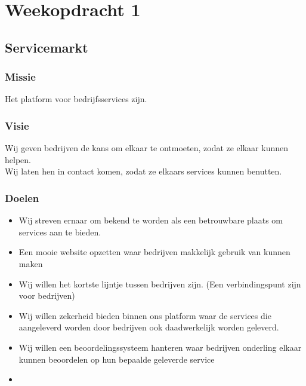 \chapter{Weekopdracht 1}

\iffalse
Wij verbinden bedrijven
Wij laten bedrijven samenwerken
Community van bedrijven
Wij introduceren bedrijven aan elkaar
Matchmaker voor bedrijfrelaties
Om bedrijven makkelijk met elkaar in contact te brengen voor het delen van services.
door middel van delen van services
\fi

\section{Servicemarkt}

\subsection{Missie}
Het platform voor bedrijfsservices zijn.

\subsection{Visie}
Wij geven bedrijven de kans om elkaar te ontmoeten, zodat ze elkaar kunnen helpen. \\
Wij laten hen in contact komen, zodat ze elkaars services kunnen benutten.

\subsection{Doelen}

\begin{itemize}
\item
  Wij streven ernaar om bekend te worden als een betrouwbare plaats om services aan te bieden.
\item
  Een mooie website opzetten waar bedrijven makkelijk gebruik van kunnen maken
\item
  Wij willen het kortste lijntje tussen bedrijven zijn. (Een verbindingspunt zijn voor bedrijven)
\item
  Wij willen zekerheid bieden binnen ons platform waar de services die aangeleverd worden door bedrijven ook daadwerkelijk worden geleverd.
 \item
  Wij willen een beoordelingssysteem hanteren waar bedrijven onderling elkaar kunnen beoordelen op hun bepaalde geleverde service
 \item
  
\end{itemize}

